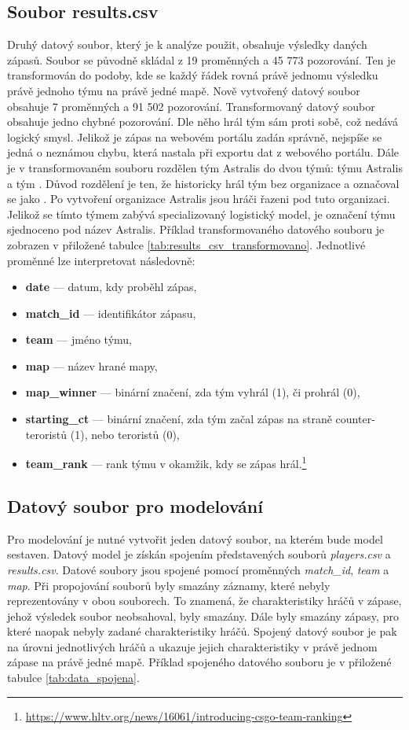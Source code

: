 \subsection{Soubor results.csv}
Druhý datový soubor, který je k analýze použit, obsahuje výsledky daných zápasů. Soubor se původně skládal z 19 proměnných a 45 773 pozorování. Ten je transformován do podoby,
kde se každý řádek rovná právě jednomu výsledku právě jednoho týmu na právě jedné mapě. Nově vytvořený datový soubor obsahuje 7 proměnných a 91 502 pozorování.  
Transformovaný datový soubor obsahuje jedno chybné pozorování. Dle něho hrál tým sám proti sobě, což nedává logický smysl.  Jelikož je zápas na webovém portálu zadán správně,
nejspíše se jedná o neznámou chybu, která nastala při exportu dat z webového portálu. Dále je v transformovaném souboru rozdělen tým Astralis do dvou týmů: týmu Astralis a tým
. Důvod rozdělení je ten, že historicky hrál tým bez organizace a označoval se jako . Po vytvoření organizace Astralis jsou hráči řazeni pod tuto organizaci. Jelikož
se tímto týmem zabývá specializovaný logistický model, je označení týmu sjednoceno pod název Astralis. Příklad transformovaného datového souboru je zobrazen v přiložené
tabulce \ref{tab:results_csv_transformovano}. Jednotlivé proměnné lze interpretovat následovně:
\begin{itemize}
    \item \textbf{date} --- datum, kdy proběhl zápas,
    \item \textbf{match\_id} --- identifikátor zápasu,
    \item \textbf{team} --- jméno týmu,
    \item \textbf{map} --- název hrané mapy,
    \item \textbf{map\_winner} --- binární značení, zda tým vyhrál (1), či prohrál (0),
    \item \textbf{starting\_ct} --- binární značení, zda tým začal zápas na straně counter-teroristů (1), nebo teroristů (0),
    \item \textbf{team\_rank} --- rank týmu v okamžik, kdy se zápas hrál.\footnote{\url{https://www.hltv.org/news/16061/introducing-csgo-team-ranking}}
\end{itemize}

\subsection{Datový soubor pro modelování} \label{sec:spojeny_datovy_soubor}
Pro modelování je nutné vytvořit jeden datový soubor, na kterém bude model sestaven. Datový model je získán spojením představených souborů
\textit{players.csv} a \textit{results.csv}. Datové soubory jsou spojené pomocí proměnných \textit{match\_id}, \textit{team} a \textit{map}. Při propojování
souborů byly smazány záznamy, které nebyly reprezentovány v obou souborech. To znamená, že charakteristiky hráčů v zápase, jehož výsledek soubor neobsahoval, byly smazány.
Dále byly smazány zápasy, pro které naopak nebyly zadané charakteristiky hráčů. Spojený datový soubor je pak na úrovni jednotlivých hráčů a ukazuje jejich charakteristiky
v právě jednom zápase na právě jedné mapě. Příklad spojeného datového souboru je v přiložené tabulce \ref{tab:data_spojena}.


